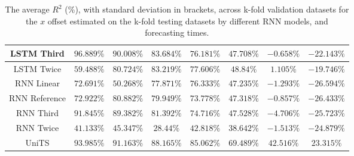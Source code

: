 \begin{table}[!ht]
{\begin{tabular}{|c|c|c|c|c|c|c|c|}
			LSTM Third & $\mathbf{96.889\%}$ & $90.008\%$ & $83.684\%$ & $76.181\%$ & $47.708\%$ & $-0.658\%$ & $-22.143\%$ \\ \hline
			LSTM Twice & $59.488\%$ & $80.724\%$ & $83.219\%$ & $77.606\%$ & $48.84\%$ & $1.105\%$ & $-19.746\%$ \\ \hline
			RNN Linear & $72.691\%$ & $50.268\%$ & $77.871\%$ & $76.333\%$ & $47.235\%$ & $-1.293\%$ & $-26.594\%$ \\ \hline
			RNN Reference & $72.922\%$ & $80.882\%$ & $79.949\%$ & $73.778\%$ & $47.318\%$ & $-0.857\%$ & $-26.433\%$ \\ \hline
			RNN Third & $91.845\%$ & $89.382\%$ & $81.392\%$ & $74.716\%$ & $47.528\%$ & $-4.706\%$ & $-25.723\%$ \\ \hline
			RNN Twice & $41.133\%$ & $45.347\%$ & $28.44\%$ & $42.818\%$ & $38.642\%$ & $-1.513\%$ & $-24.879\%$ \\ \hline
			UniTS & $93.985\%$ & $91.163\%$ & $\mathbf{88.165\%}$ & $\mathbf{85.062\%}$ & $\mathbf{69.489\%}$ & $\mathbf{42.516\%}$ & $\mathbf{23.315\%}$ \\ \hline
		\end{tabular}
	}
	\caption{The average $R^{2}$ (\%), with standard deviation in brackets, across k-fold validation datasets for the $x$ offset estimated on the k-fold testing datasets by different RNN models, and forecasting times.}
	\label{tab:all_longitude_no_abs_R2}
\end{table}

